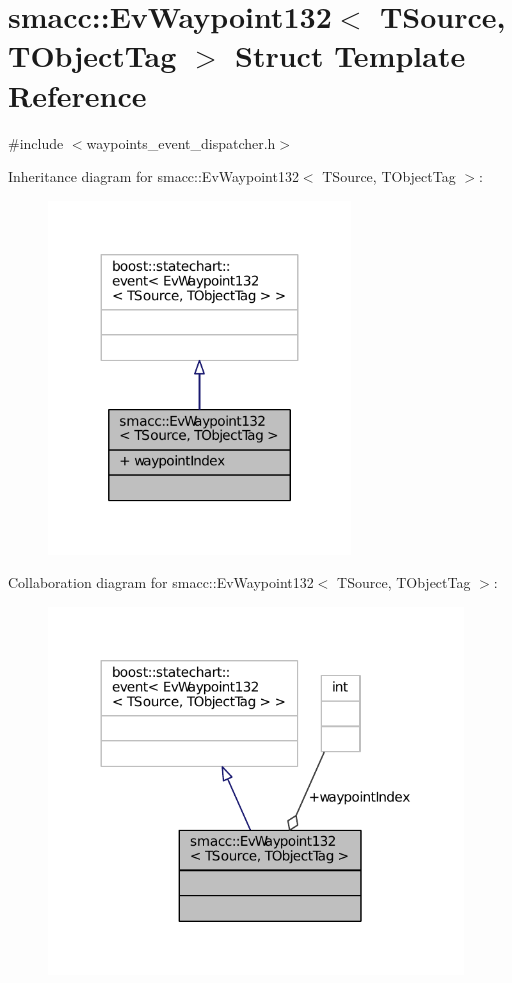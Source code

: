 \hypertarget{structsmacc_1_1EvWaypoint132}{}\section{smacc\+:\+:Ev\+Waypoint132$<$ T\+Source, T\+Object\+Tag $>$ Struct Template Reference}
\label{structsmacc_1_1EvWaypoint132}


{\ttfamily \#include $<$waypoints\+\_\+event\+\_\+dispatcher.\+h$>$}



Inheritance diagram for smacc\+:\+:Ev\+Waypoint132$<$ T\+Source, T\+Object\+Tag $>$\+:
\nopagebreak
\begin{figure}[H]
\begin{center}
\leavevmode
\includegraphics[width=227pt]{structsmacc_1_1EvWaypoint132__inherit__graph}
\end{center}
\end{figure}


Collaboration diagram for smacc\+:\+:Ev\+Waypoint132$<$ T\+Source, T\+Object\+Tag $>$\+:
\nopagebreak
\begin{figure}[H]
\begin{center}
\leavevmode
\includegraphics[width=312pt]{structsmacc_1_1EvWaypoint132__coll__graph}
\end{center}
\end{figure}
